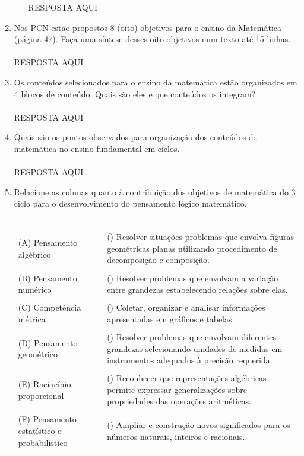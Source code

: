 \documentclass[a4paper, 12pt]{article}
\begin{document}
\begin{enumerate}
\begin{enumerate}
      RESPOSTA AQUI
  \end{enumerate}
\item Nos PCN estão propostos 8 (oito) objetivos para o ensino da Matemática (página 47). Faça uma síntese desses oito objetivos num texto até 15 linhas. \\ \\
   RESPOSTA AQUI
 \item Os conteúdos selecionados para o ensino da matemática estão organizados em 4 blocos de conteúdo. Quais são eles e que conteúdos os integram? \\ \\
    RESPOSTA AQUI
  \item Quais são os pontos observados para organização dos conteúdos de matemática no ensino fundamental em ciclos. \\ \\
     RESPOSTA AQUI
\item Relacione as colunas quanto à contribuição dos objetivos de matemática do 3 ciclo para o desenvolvimento do pensamento lógico matemático. \\ \\
  \begin{tabular}{m{5cm} m{5cm}}
    (A) Pensamento algébrico & () Resolver situações problemas que envolva figuras geométricas planas utilizando procedimento de decomposição e composição. \\ \\
    (B) Pensamento numérico & () Resolver problemas que envolvam a variação entre grandezas estabelecendo relações sobre elas. \\ \\
    (C) Competência métrica & () Coletar, organizar e analisar informações apresentadas em gráficos e tabelas. \\ \\
    (D) Pensamento geométrico & () Resolver problemas que envolvam diferentes grandezas selecionando unidades de medidas em instrumentos adequados à precisão requerida. \\ \\
    (E) Raciocínio proporcional & () Reconhecer que representações algébricas permite expressar generalizações sobre propriedades das operações aritméticas. \\ \\
    (F) Pensamento estatístico e probabilístico & () Ampliar e construção novos significados para os números naturais, inteiros e racionais.
  \end{tabular}
\end{enumerate}
\end{document}
